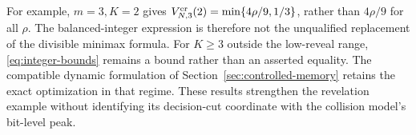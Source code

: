 For example, $m=3,K=2$ gives
$V^{\rm er}_{N,3}(2)=\min\{4\rho/9,1/3\}$, rather than $4\rho/9$
for all $\rho$. The balanced-integer expression is therefore not the
unqualified replacement of the divisible minimax formula. For
$K\ge3$ outside the low-reveal range, \eqref{eq:integer-bounds} remains
a bound rather than an asserted equality. The compatible dynamic
formulation of Section~\ref{sec:controlled-memory} retains the exact
optimization in that regime. These results strengthen the revelation
example without identifying its decision-cut coordinate with the
collision model's bit-level peak.

